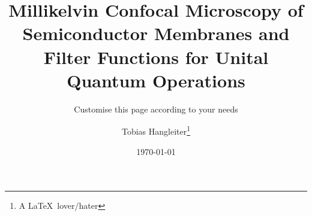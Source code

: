 \documentclass[
	a4paper, %
	fontsize=10pt, %
	twoside=false, %
	numbers=noenddot, %
	fontmethod=modern, %
	listing=minted
]{kaobook}
\begin{document}

\titlehead{The \texttt{kaobook} class}
\subject{Use this document as a template}

\title[My PhD Thesis]{
	Millikelvin Confocal Microscopy of Semiconductor Membranes and Filter Functions for Unital Quantum Operations
}
\subtitle{Customise this page according to your needs}

\author[Tobias Hangleiter]{Tobias Hangleiter\thanks{A \LaTeX\ lover/hater}}

\date{\today}


\frontmatter %




\makeatletter
\uppertitleback{\@titlehead} %
\end{document}
